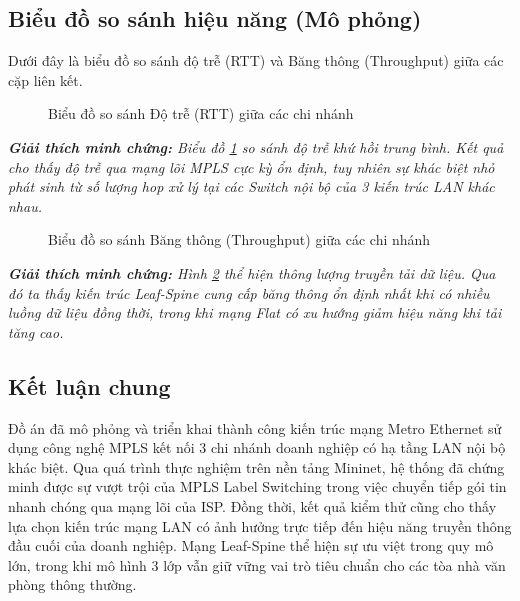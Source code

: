 \subsection{Biểu đồ so sánh hiệu năng (Mô phỏng)}
Dưới đây là biểu đồ so sánh độ trễ (RTT) và Băng thông (Throughput) giữa các cặp liên kết.

\begin{figure}[H]
    \centering
    \caption{Biểu đồ so sánh Độ trễ (RTT) giữa các chi nhánh}
    \label{fig:chart_delay}
\end{figure}
\textit{\textbf{Giải thích minh chứng:} Biểu đồ \ref{fig:chart_delay} so sánh độ trễ khứ hồi trung bình. Kết quả cho thấy độ trễ qua mạng lõi MPLS cực kỳ ổn định, tuy nhiên sự khác biệt nhỏ phát sinh từ số lượng hop xử lý tại các Switch nội bộ của 3 kiến trúc LAN khác nhau.}

\begin{figure}[H]
    \centering
    \caption{Biểu đồ so sánh Băng thông (Throughput) giữa các chi nhánh}
    \label{fig:chart_throughput}
\end{figure}
\textit{\textbf{Giải thích minh chứng:} Hình \ref{fig:chart_throughput} thể hiện thông lượng truyền tải dữ liệu. Qua đó ta thấy kiến trúc Leaf-Spine cung cấp băng thông ổn định nhất khi có nhiều luồng dữ liệu đồng thời, trong khi mạng Flat có xu hướng giảm hiệu năng khi tải tăng cao.}

\subsection{Kết luận chung}
Đồ án đã mô phỏng và triển khai thành công kiến trúc mạng Metro Ethernet sử dụng công nghệ MPLS kết nối 3 chi nhánh doanh nghiệp có hạ tầng LAN nội bộ khác biệt. 
Qua quá trình thực nghiệm trên nền tảng Mininet, hệ thống đã chứng minh được sự vượt trội của MPLS Label Switching trong việc chuyển tiếp gói tin nhanh chóng qua mạng lõi của ISP. Đồng thời, kết quả kiểm thử cũng cho thấy lựa chọn kiến trúc mạng LAN có ảnh hưởng trực tiếp đến hiệu năng truyền thông đầu cuối của doanh nghiệp. Mạng Leaf-Spine thể hiện sự ưu việt trong quy mô lớn, trong khi mô hình 3 lớp vẫn giữ vững vai trò tiêu chuẩn cho các tòa nhà văn phòng thông thường.
